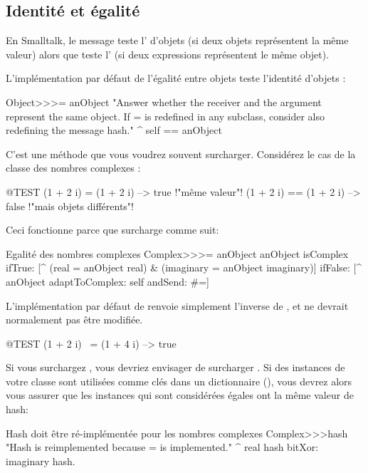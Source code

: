 \documentclass[a4paper,10pt,twoside]{book}
\begin{document}
\subsection{Identité et égalité}

En Smalltalk, le message \ct{=} teste l' d'objets (\ie si deux objets représentent la même valeur) alors que \ct{==} teste l' (\ie si deux expressions représentent le même objet).

L'implémentation par défaut de l'égalité entre objets teste l'identité d'objets :
\begin{method}{}
Object>>>= anObject
    "Answer whether the receiver and the argument represent the same object.
    If = is redefined in any subclass, consider also redefining the message hash."
    ^ self == anObject
\end{method}

C'est une méthode que vous voudrez souvent surcharger. Considérez le cas de la classe des nombres complexes :

\begin{code}{@TEST}
(1 + 2 i) = (1 + 2 i)   --> true     !"même valeur"!
(1 + 2 i) == (1 + 2 i)  --> false    !"mais objets différents"!
\end{code}

Ceci fonctionne parce que  surcharge \ct{=} comme suit:
\begin{method}{Egalité des nombres complexes}
Complex>>>= anObject
    anObject isComplex
        ifTrue: [^ (real = anObject real) & (imaginary = anObject imaginary)]
        ifFalse: [^ anObject adaptToComplex: self andSend: #=]
\end{method}

L'implémentation par défaut de  renvoie simplement l'inverse de , et ne devrait normalement pas être modifiée.

\begin{code}{@TEST}
(1 + 2 i) ~= (1 + 4 i) --> true
\end{code}

Si vous surchargez \ct{=}, vous devriez envisager de surcharger . Si des instances de votre classe sont utilisées comme clés dans un dictionnaire (), vous devrez alors vous assurer que les instances qui sont considérées égales ont la même valeur de hash:
\begin{method}{Hash doit être ré-implémentée pour les nombres complexes}
Complex>>>hash
    "Hash is reimplemented because = is implemented."
    ^ real hash bitXor: imaginary hash.
\end{method}
\end{document}
